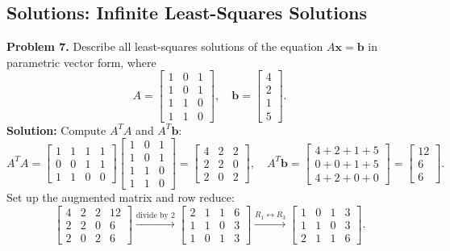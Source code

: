 \documentclass[11pt, letterpaper]{article}
\theoremstyle{definition}
\theoremstyle{remark}
\begin{document}
\subsection{Solutions: Infinite Least-Squares Solutions}

\textbf{Problem 7.} Describe all least-squares solutions of the equation $A\mathbf{x} = \mathbf{b}$ in parametric vector form, where
\[
A = \begin{bmatrix} 1 & 0 & 1 \\ 1 & 0 & 1 \\ 1 & 1 & 0 \\ 1 & 1 & 0 \end{bmatrix}, \quad \mathbf{b} = \begin{bmatrix} 4 \\ 2 \\ 1 \\ 5 \end{bmatrix}.
\]
\textbf{Solution:} Compute $A^T A$ and $A^T \mathbf{b}$:
\[
A^T A = \begin{bmatrix} 1 & 1 & 1 & 1 \\ 0 & 0 & 1 & 1 \\ 1 & 1 & 0 & 0 \end{bmatrix} \begin{bmatrix} 1 & 0 & 1 \\ 1 & 0 & 1 \\ 1 & 1 & 0 \\ 1 & 1 & 0 \end{bmatrix} = \begin{bmatrix} 4 & 2 & 2 \\ 2 & 2 & 0 \\ 2 & 0 & 2 \end{bmatrix}, \quad A^T \mathbf{b} = \begin{bmatrix} 4+2+1+5 \\ 0+0+1+5 \\ 4+2+0+0 \end{bmatrix} = \begin{bmatrix} 12 \\ 6 \\ 6 \end{bmatrix}.
\]
Set up the augmented matrix and row reduce:
\[
\left[\begin{array}{ccc|c} 4 & 2 & 2 & 12 \\ 2 & 2 & 0 & 6 \\ 2 & 0 & 2 & 6 \end{array}\right] \xrightarrow{\text{divide by } 2} \left[\begin{array}{ccc|c} 2 & 1 & 1 & 6 \\ 1 & 1 & 0 & 3 \\ 1 & 0 & 1 & 3 \end{array}\right] \xrightarrow{R_1 \leftrightarrow R_3} \left[\begin{array}{ccc|c} 1 & 0 & 1 & 3 \\ 1 & 1 & 0 & 3 \\ 2 & 1 & 1 & 6 \end{array}\right].
\]
\end{document}
